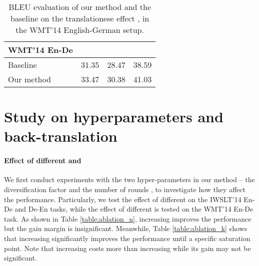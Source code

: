 \documentclass{article}
\begin{document}
\begin{table}[hbt!]
\vspace{-0.5em}
\begin{center}
\caption{BLEU evaluation of our method and the baseline on the translationese effect \citep{eval_back_translation_translationese}, in the WMT'14 English-German setup.}
\begin{tabular}{lccc}
\toprule
{\bf WMT'14 En-De} & {\bf }     & {\bf }      & {\bf } \\
\midrule
Baseline \citep{scaling_nmt_ott2018scaling}        & 31.35   & 28.47   & 38.59   \\
Our method      & 33.47   & 30.38   & 41.03\\
\bottomrule
\end{tabular}
\vspace{-1em}
\label{table:translationese}
\end{center}
\end{table}


\section{Study on hyperparameters and back-translation}




\paragraph{Effect of different  and }

We first conduct experiments with the two hyper-parameters in our method -- the diversification factor  and the number of rounds , to investigate how they affect the performance. Particularly, we test the effect of different  on the IWSLT'14 En-De and De-En tasks, while the effect of different  is tested on the WMT'14 En-De task. As shown in Table \ref{table:ablation_n}, increasing  improves the performance but the gain margin is insignificant. Meanwhile, Table \ref{table:ablation_k} shows that increasing  significantly improves the performance until a specific saturation point. Note that increasing  costs more than increasing  while its gain may not be significant.
\end{document}
